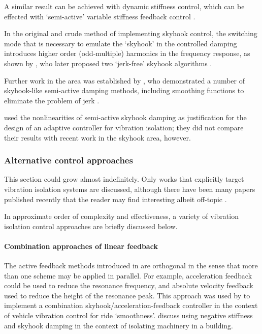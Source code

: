 A similar result  can be achieved with dynamic stiffness control, which can be effected with `semi-active' variable stiffness feedback control \cite{leavitt2007}.

In the original and crude method of implementing skyhook control, the switching mode that is necessary to emulate the `skyhook' in the controlled damping introduces higher order (odd-multiple) harmonics in the frequency response, as shown by \textcite{ahmadian2001}, who later proposed two `jerk-free' skyhook algorithms \cite{ahmadian2004}.

Further work in the area was established by \textcite{liu2002}, who demonstrated a number of skyhook-like semi-active damping methods, including smoothing functions to eliminate the problem of jerk
\cite{liu2005}.

\textcite{song2007} used the nonlinearities of semi-active skyhook damping as justification for the design of an adaptive controller for vibration isolation; they did not compare their results with recent work in the skyhook area, however.


\subsubsection{Alternative control approaches}

This section could grow almost indefinitely. Only works that explicitly target vibration isolation systems are discussed, although there have been many papers published recently that the reader may find interesting albeit off-topic \cite{chatterjee2008,mottershead2008}.

In approximate order of complexity and effectiveness, a variety of vibration isolation control approaches are briefly discussed below.

\paragraph{Combination approaches of linear feedback}

The active feedback methods introduced in  are orthogonal in the sense that more than one scheme may be applied in parallel.
For example, acceleration feedback could be used to reduce the resonance frequency, and absolute velocity feedback used to reduce the height of the resonance peak.
This approach was used by \textcite{savaresi2007} to implement a combination skyhook/acceleration-feedback controller in the context of vehicle vibration control for ride `smoothness'.
\textcite{gavin2007} discuss using negative stiffness and skyhook damping in the context of isolating machinery in a building.


